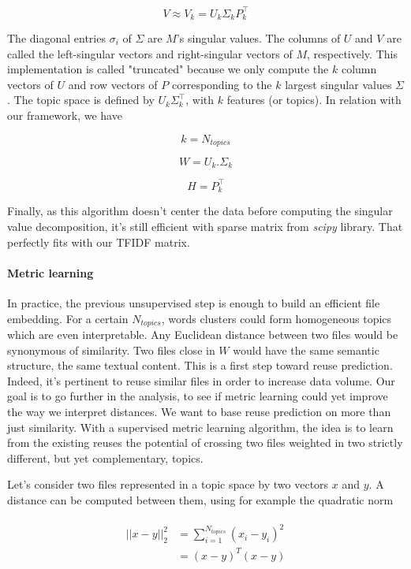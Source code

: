 \documentclass[a4paper]{article}
\begin{document}
	\begin{equation}
		V \approx V_k = U_k \Sigma_k P_k^\top
	\end{equation}
	
	The diagonal entries $\sigma_{i}$ of $\Sigma$ are $M$'s singular values. The columns of $U$ and $V$ are called the left-singular vectors and right-singular vectors of $M$, respectively. This implementation is called "truncated" because we only compute the $k$ column vectors of $U$ and row vectors of $P$ corresponding to the $k$ largest singular values $\Sigma$. The topic space is defined by $U_k \Sigma_k^\top$, with $k$ features (or topics). In relation with our framework, we have
	
	\[
		k = N_{topics}
	\]
	
	\[
		W = U_k.\Sigma_k
	\]
	
	\[
		H = P_k^\top
	\]
	
	Finally, as this algorithm doesn't center the data before computing the singular value decomposition, it's still efficient with sparse matrix from \emph{scipy} library. That perfectly fits with our \ac{TFIDF} matrix.
	
	\paragraph{Metric learning}
	
	In practice, the previous unsupervised step is enough to build an efficient file embedding. For a certain $N_{topics}$, words clusters could form homogeneous topics which are even interpretable. Any Euclidean distance between two files would be synonymous of similarity. Two files close in $W$ would have the same semantic structure, the same textual content. This is a first step toward reuse prediction. Indeed, it's pertinent to reuse similar files in order to increase data volume. Our goal is to go further in the analysis, to see if metric learning could yet improve the way we interpret distances. We want to base reuse prediction on more than just similarity. With a supervised metric learning algorithm, the idea is to learn from the existing reuses the potential of crossing two files weighted in two strictly different, but yet complementary, topics.
	
	Let's consider two files represented in a topic space by two vectors $x$ and $y$. A distance can be computed between them, using for example the quadratic norm
	
	\begin{align}
	\begin{split}
	||x - y||^2_2 &= \sum_{i=1}^{N_{topics}}(x_i - y_i)^2\\ 
				  &= (x - y)^T(x - y)
	\end{split}
	\end{align}
	
\end{document}
